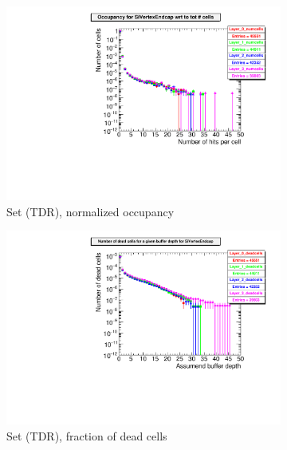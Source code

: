   \begin{figure}[!htbp]
 \centering
   \begin{subfigure}[b]{0.49\textwidth}
   \centering
    \includegraphics[width=\textwidth]{Figures/Pairs/Appendix/occupancy_numcells_SiVertexEndcap_ILC250_TDR.pdf}
   \caption{Set (TDR), normalized occupancy}
   \end{subfigure}
   \hfill
    \begin{subfigure}[b]{0.49\textwidth}
   \centering
    \includegraphics[width=\textwidth]{Figures/Pairs/Appendix/occupancy_deadcells_SiVertexEndcap_ILC250_TDR.pdf}
   \caption{Set (TDR), fraction of dead cells}
   \end{subfigure}\\
  \begin{subfigure}[b]{0.49\textwidth}

\end{subfigure}
\end{figure}
